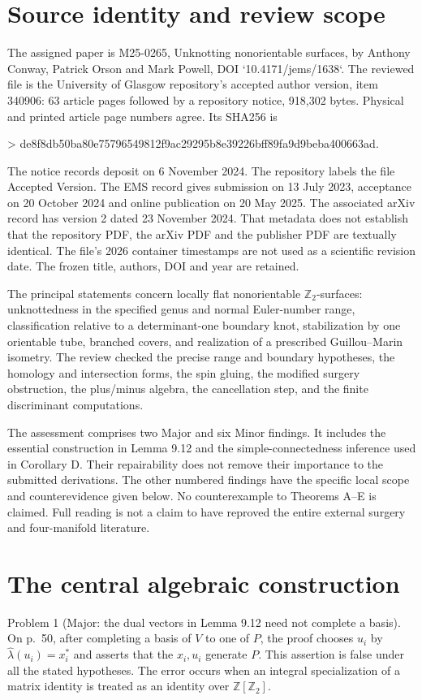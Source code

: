 \documentclass[10pt]{article}
\begin{document}
\section*{Source identity and review scope}
The assigned paper is M25-0265, Unknotting nonorientable surfaces, by Anthony Conway, Patrick Orson and Mark Powell, DOI `10.4171/jems/1638`. The reviewed file is the University of Glasgow repository’s accepted author version, item 340906: 63 article pages followed by a repository notice, 918,302 bytes. Physical and printed article page numbers agree. Its SHA256 is\par
> de8f8db50ba80e75796549812f9ac29295b8e39226bff89fa9d9beba400663ad.\par
The notice records deposit on 6 November 2024. The repository labels the file Accepted Version. The EMS record gives submission on 13 July 2023, acceptance on 20 October 2024 and online publication on 20 May 2025. The associated arXiv record has version 2 dated 23 November 2024. That metadata does not establish that the repository PDF, the arXiv PDF and the publisher PDF are textually identical. The file’s 2026 container timestamps are not used as a scientific revision date. The frozen title, authors, DOI and year are retained.\par
The principal statements concern locally flat nonorientable \(\mathbb Z_2\)-surfaces: unknottedness in the specified genus and normal Euler-number range, classification relative to a determinant-one boundary knot, stabilization by one orientable tube, branched covers, and realization of a prescribed Guillou–Marin isometry. The review checked the precise range and boundary hypotheses, the homology and intersection forms, the spin gluing, the modified surgery obstruction, the plus/minus algebra, the cancellation step, and the finite discriminant computations.\par
The assessment comprises two Major and six Minor findings. It includes the essential construction in Lemma 9.12 and the simple-connectedness inference used in Corollary D. Their repairability does not remove their importance to the submitted derivations. The other numbered findings have the specific local scope and counterevidence given below. No counterexample to Theorems A–E is claimed. Full reading is not a claim to have reproved the entire external surgery and four-manifold literature.\par
\section*{The central algebraic construction}
Problem 1 (Major: the dual vectors in Lemma 9.12 need not complete a basis).  On p. 50, after completing a basis of \(V\) to one of \(P\), the proof chooses \(u_i\) by \(\widehat\lambda(u_i)=x_i^*\) and asserts that the \(x_i,u_i\) generate \(P\). This assertion is false under all the stated hypotheses. The error occurs when an integral specialization of a matrix identity is treated as an identity over \(\mathbb Z[\mathbb Z_2]\).\par
\end{document}

